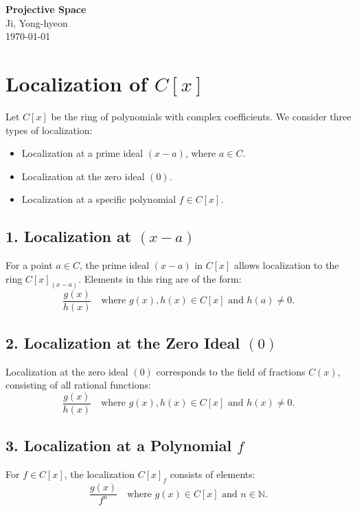 \documentclass[11pt,openany]{article}
\begin{document}
\begin{center}
	\huge\textbf{Projective Space}\\
	\vspace{0.5em}
	\large{Ji, Yong-hyeon}\\
	\vspace{0.5em}
	\normalsize{\today}\\
\end{center}
\section*{Localization of \( C[x] \)}

Let \( C[x] \) be the ring of polynomials with complex coefficients. We consider three types of localization:
\begin{itemize}
	\item Localization at a prime ideal \( (x - a) \), where \( a \in C \).
	\item Localization at the zero ideal \( (0) \).
	\item Localization at a specific polynomial \( f \in C[x] \).
\end{itemize}

\subsection*{1. Localization at \( (x - a) \)}

For a point \( a \in C \), the prime ideal \( (x - a) \) in \( C[x] \) allows localization to the ring \( C[x]_{(x - a)} \). Elements in this ring are of the form:
\[
\frac{g(x)}{h(x)} \quad \text{where } g(x), h(x) \in C[x] \text{ and } h(a) \neq 0.
\]

\subsection*{2. Localization at the Zero Ideal \( (0) \)}

Localization at the zero ideal \( (0) \) corresponds to the field of fractions \( C(x) \), consisting of all rational functions:
\[
\frac{g(x)}{h(x)} \quad \text{where } g(x), h(x) \in C[x] \text{ and } h(x) \neq 0.
\]

\subsection*{3. Localization at a Polynomial \( f \)}

For \( f \in C[x] \), the localization \( C[x]_f \) consists of elements:
\[
\frac{g(x)}{f^n} \quad \text{where } g(x) \in C[x] \text{ and } n \in \mathbb{N}.
\]
\end{document}
